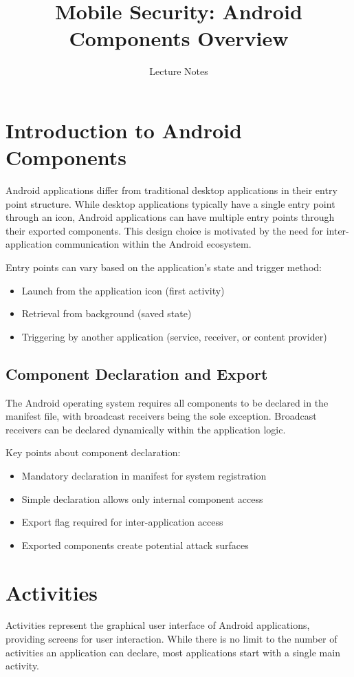 \documentclass{article}
\title{Mobile Security: Android Components Overview}
\author{Lecture Notes}
\date{}
\begin{document}
\maketitle

\section{Introduction to Android Components}
Android applications differ from traditional desktop applications in their entry point structure. While desktop applications typically have a single entry point through an icon, Android applications can have multiple entry points through their exported components. This design choice is motivated by the need for inter-application communication within the Android ecosystem.

Entry points can vary based on the application's state and trigger method:
\begin{itemize}
    \item Launch from the application icon (first activity)
    \item Retrieval from background (saved state)
    \item Triggering by another application (service, receiver, or content provider)
\end{itemize}

\subsection{Component Declaration and Export}
The Android operating system requires all components to be declared in the manifest file, with broadcast receivers being the sole exception. Broadcast receivers can be declared dynamically within the application logic.

Key points about component declaration:
\begin{itemize}
    \item Mandatory declaration in manifest for system registration
    \item Simple declaration allows only internal component access
    \item Export flag required for inter-application access
    \item Exported components create potential attack surfaces
\end{itemize}

\section{Activities}
Activities represent the graphical user interface of Android applications, providing screens for user interaction. While there is no limit to the number of activities an application can declare, most applications start with a single main activity.
\end{document}

